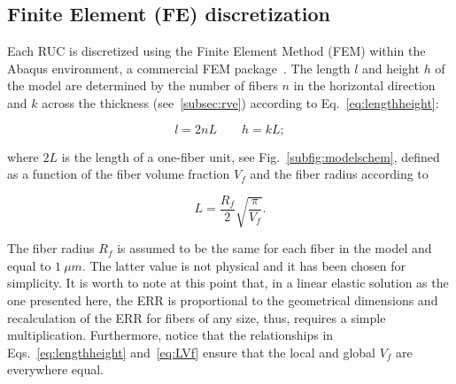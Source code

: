 \documentclass[review]{elsarticle}
\begin{document}
%

\subsection{Finite Element (FE) discretization}

Each RUC is discretized using the Finite Element Method (FEM) within the Abaqus environment, a commercial FEM package~\cite{abq12}. The length $l$ and height $h$ of the model are determined by the number of fibers $n$ in the horizontal direction and $k$ across the thickness (see~\ref{subsec:rve}) according to Eq.~\ref{eq:lengthheight}:

\begin{equation}\label{eq:lengthheight}
l=2nL\qquad h=kL;
\end{equation}

where $2L$ is the length of a one-fiber unit, see Fig.~\ref{subfig:modelschem}, defined as a function of the fiber volume fraction $V_{f}$ and the fiber radius according to

\begin{equation}\label{eq:LVf}
L=\frac{R_{f}}{2}\sqrt{\frac{\pi}{V_{f}}}.
\end{equation}

The fiber radius $R_{f}$ is assumed to be the same for each fiber in the model and equal to $1\ \mu m$. The latter value is not physical and it has been chosen for simplicity. It is worth to note at this point that, in a linear elastic solution as the one presented here, the ERR is proportional to the geometrical dimensions and recalculation of the ERR for fibers of any size, thus, requires a simple multiplication. Furthermore, notice that the relationships in Eqs.~\ref{eq:lengthheight} and~\ref{eq:LVf} ensure that the local and global $V_{f}$ are everywhere equal.
\end{document}

